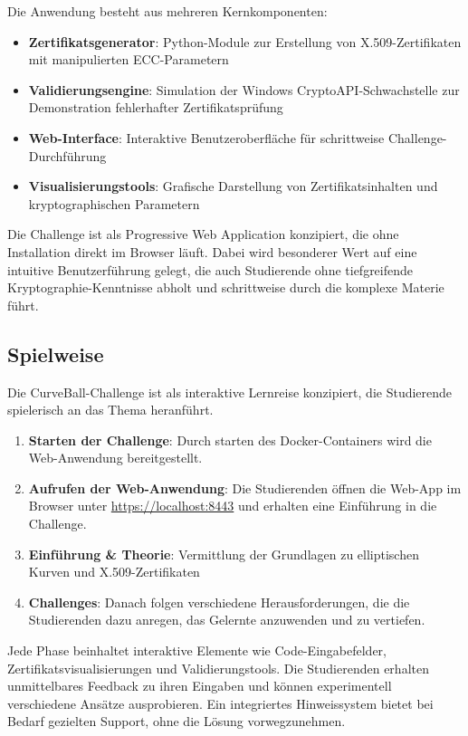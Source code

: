 \documentclass{article}
\begin{document}
\noindent
Die Anwendung besteht aus mehreren Kernkomponenten:

\begin{itemize}
  \item \textbf{Zertifikatsgenerator}: Python-Module zur Erstellung von X.509-Zertifikaten mit manipulierten ECC-Parametern
  \item \textbf{Validierungsengine}: Simulation der Windows CryptoAPI-Schwachstelle zur Demonstration fehlerhafter Zertifikatsprüfung
  \item \textbf{Web-Interface}: Interaktive Benutzeroberfläche für schrittweise Challenge-Durchführung
  \item \textbf{Visualisierungstools}: Grafische Darstellung von Zertifikatsinhalten und kryptographischen Parametern
\end{itemize}

\noindent
Die Challenge ist als Progressive Web Application konzipiert, die ohne Installation direkt im Browser läuft. Dabei wird besonderer Wert auf eine intuitive Benutzerführung gelegt, die auch Studierende ohne tiefgreifende Kryptographie-Kenntnisse abholt und schrittweise durch die komplexe Materie führt.

\subsection{Spielweise}
Die CurveBall-Challenge ist als interaktive Lernreise konzipiert, die Studierende spielerisch an das Thema heranführt.
\begin{enumerate}
  \item \textbf{Starten der Challenge}: Durch starten des Docker-Containers wird die Web-Anwendung bereitgestellt.
  \item \textbf{Aufrufen der Web-Anwendung}: Die Studierenden öffnen die Web-App im Browser unter \url{https://localhost:8443} und erhalten eine Einführung in die Challenge.
  \item \textbf{Einführung \& Theorie}: Vermittlung der Grundlagen zu elliptischen Kurven und X.509-Zertifikaten
  \item \textbf{Challenges}: Danach folgen verschiedene Herausforderungen, die die Studierenden dazu anregen, das Gelernte anzuwenden und zu vertiefen.
\end{enumerate}

\noindent
Jede Phase beinhaltet interaktive Elemente wie Code-Eingabefelder, Zertifikatsvisualisierungen und Validierungstools. Die Studierenden erhalten unmittelbares Feedback zu ihren Eingaben und können experimentell verschiedene Ansätze ausprobieren. Ein integriertes Hinweissystem bietet bei Bedarf gezielten Support, ohne die Lösung vorwegzunehmen.
\end{document}
